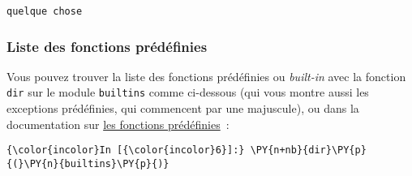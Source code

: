     \begin{Verbatim}[commandchars=\\\{\}]
quelque chose

    \end{Verbatim}

    \hypertarget{liste-des-fonctions-pruxe9duxe9finies}{%
\subsubsection{Liste des fonctions
prédéfinies}\label{liste-des-fonctions-pruxe9duxe9finies}}

    Vous pouvez trouver la liste des fonctions prédéfinies ou
\emph{built-in} avec la fonction \texttt{dir} sur le module
\texttt{builtins} comme ci-dessous (qui vous montre aussi les exceptions
prédéfinies, qui commencent par une majuscule), ou dans la documentation
sur
\href{https://docs.python.org/3/library/functions.html\#built-in-funcs}{les
fonctions prédéfinies}~:

    \begin{Verbatim}[commandchars=\\\{\}]
{\color{incolor}In [{\color{incolor}6}]:} \PY{n+nb}{dir}\PY{p}{(}\PY{n}{builtins}\PY{p}{)}
\end{Verbatim}


